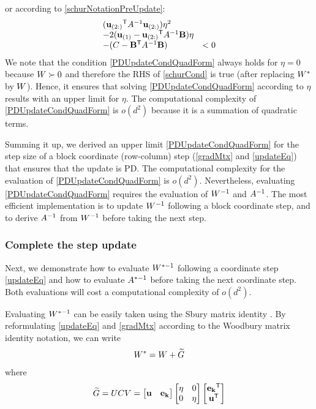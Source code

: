 \documentclass{article}
\begin{document}
or according to \eqref{schurNotationPreUpdate}:
\begin{equation}
\begin{array}{ll} 
(\mathbf{u}_{(2:)}{}^\mathsf{T} {A}^{-1} \mathbf{u}_{(2:)}) \eta^2 \\
-2(\mathbf{u}_{(1)} - \mathbf{u}_{(2:)}{}^\mathsf{T} {A}^{-1}\mathbf{B})\eta \\
-(C - \mathbf{B}{}^\mathsf{T}  {A}^{-1} \mathbf{B}) & < 0
\end{array}
\label{PDUpdateCondQuadForm}
\end{equation}
We note that the condition \eqref{PDUpdateCondQuadForm} always holds for $\eta = 0$ because ${W}\succ0$ and therefore the RHS of \eqref{schurCond} is true (after replacing ${W}^*$ by ${W}$). Hence, it ensures that solving \eqref{PDUpdateCondQuadForm} according to $\eta$ results with an upper limit for $\eta$.  The computational complexity of \eqref{PDUpdateCondQuadForm} is $o(d^2)$ because it is a summation of quadratic terms. 

Summing it up, we derived an upper limit \eqref{PDUpdateCondQuadForm} for the step size of a block coordinate (row-column) step (\eqref{gradMtx} and \eqref{updateEq}) that ensures that the update is PD. The computational complexity for the evaluation of \eqref{PDUpdateCondQuadForm} is $o(d^2)$. Nevertheless, evaluating \eqref{PDUpdateCondQuadForm} requires the evaluation of ${W}^{-1}$ and ${A}^{-1}$. The most efficient implementation is to update ${W}^{-1}$ following a block coordinate step, and to derive ${A}^{-1}$ from ${W}^{-1}$ before taking the next step. 

\subsubsection{Complete the step update}

Next, we demonstrate how to evaluate ${W}^{*-1}$ following a coordinate step \eqref{updateEq} and how to evaluate ${A}^{*-1}$ before taking the next coordinate step. Both evaluations will cost a computational complexity of $o(d^2)$.

Evaluating ${W}^{*-1}$ can be easily taken using the Sbury matrix identity . By reformulating \eqref{updateEq} and \eqref{gradMtx} according to the Woodbury matrix identity notation, we can write
\begin{equation}
{W^*} = {W}+{\widetilde{G}}
\label{updateEqWDB}
\end{equation}
where
\begin{equation}
{\widetilde{G}} = {U}{C}{V} = \left[ \begin{matrix} \mathbf{u} & \mathbf{e_k} \end{matrix} \right] \left[ \begin{matrix} \eta & 0 \\ 0 & \eta \end{matrix} \right] \left[ \begin{matrix} \mathbf{e_k}{}^\mathsf{T} \\ \mathbf{u}{}^\mathsf{T} \end{matrix} \right]
\label{gradMtxWDB}
\end{equation}
\end{document}
